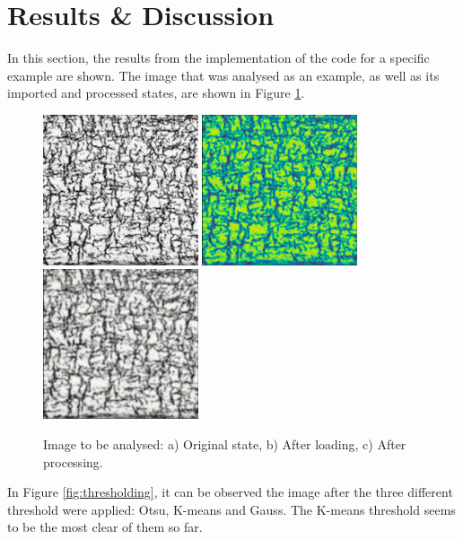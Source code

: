 \section{Results \& Discussion}

In this section, the results from the implementation of the code for a specific example are shown. The image that was analysed as an example, as well as its imported and processed states, are shown in Figure \ref{fig:load&processing}.

\begin{figure}[h] %
    \centering
    \includegraphics[width=1.8in]{Figures/5-Results/chu7.jpg}
    \includegraphics[width=1.8in]{Figures/5-Results/loading.PNG}
    \includegraphics[width=1.8in]{Figures/5-Results/processing.PNG}
    \caption{Image to be analysed: a) Original state, b) After loading, c) After processing.}
    \label{fig:load&processing}
\end{figure}

\noindent
In Figure \ref{fig:thresholding}, it can be observed the image after the three different threshold were applied: Otsu, K-means and Gauss. The K-means threshold seems to be the most clear of them so far.

